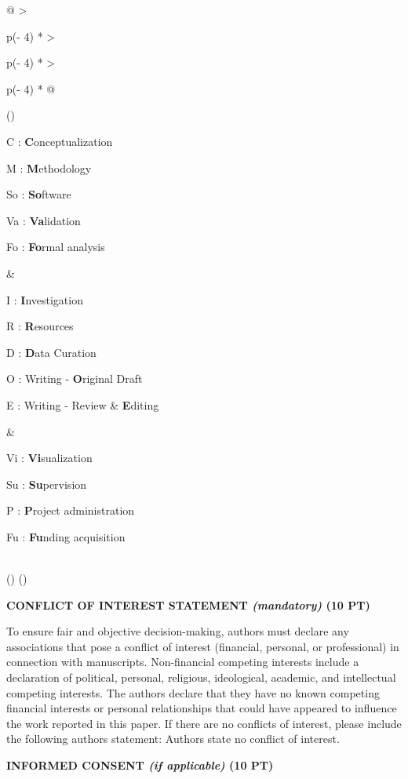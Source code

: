 \documentclass[
]{article}
\begin{document}
\begin{longtable}[]{@{}
  >{\raggedright\arraybackslash}p{(\columnwidth - 4\tabcolsep) * }
  >{\raggedright\arraybackslash}p{(\columnwidth - 4\tabcolsep) * }
  >{\raggedright\arraybackslash}p{(\columnwidth - 4\tabcolsep) * }@{}}
\toprule()
\begin{minipage}[b]{\linewidth}\raggedright
C : \textbf{C}onceptualization

M : \textbf{M}ethodology

So : \textbf{So}ftware

Va : \textbf{Va}lidation

Fo : \textbf{Fo}rmal analysis
\end{minipage} & \begin{minipage}[b]{\linewidth}\raggedright
I : \textbf{I}nvestigation

R : \textbf{R}esources

D : \textbf{D}ata Curation

O : Writing - \textbf{O}riginal Draft

E : Writing - Review \& \textbf{E}diting
\end{minipage} & \begin{minipage}[b]{\linewidth}\raggedright
Vi : \textbf{Vi}sualization

Su : \textbf{Su}pervision

P : \textbf{P}roject administration

Fu : \textbf{Fu}nding acquisition
\end{minipage} \\
\midrule()
\endhead
\bottomrule()
\end{longtable}

\textbf{CONFLICT OF INTEREST STATEMENT \emph{(mandatory)} (10 PT)}

To ensure fair and objective decision-making, authors must declare any associations that pose a conflict of interest (financial, personal, or professional) in connection with manuscripts. Non-financial competing interests include a declaration of political, personal, religious, ideological, academic, and intellectual competing interests. The authors declare that they have no known competing financial interests or personal relationships that could have appeared to influence the work reported in this paper. If there are no conflicts of interest, please include the following author\textquotesingle s statement: Authors state no conflict of interest.

\textbf{INFORMED CONSENT \emph{(if applicable)} (10 PT)}
\end{document}
